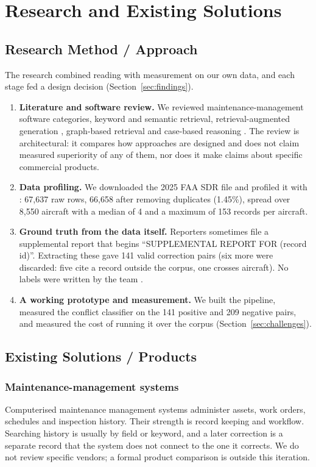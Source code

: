 \chapter{Research and Existing Solutions}\label{ch:research}

\section{Research Method / Approach}
The research combined reading with measurement on our own data, and each stage fed a design decision (Section~\ref{sec:findings}).
\begin{enumerate}
\item \textbf{Literature and software review.} We reviewed maintenance-management software categories, keyword and semantic retrieval, retrieval-augmented generation \citep{lewis2020rag,asai2023selfrag}, graph-based retrieval \citep{edge2024graphrag} and case-based reasoning \citep{aamodt1994cbr}. The review is architectural: it compares how approaches are designed and does not claim measured superiority of any of them, nor does it make claims about specific commercial products.
\item \textbf{Data profiling.} We downloaded the 2025 FAA SDR file and profiled it with : 67,637 raw rows, 66,658 after removing duplicates (1.45\%), spread over 8,550 aircraft with a median of 4 and a maximum of 153 records per aircraft.
\item \textbf{Ground truth from the data itself.} Reporters sometimes file a supplemental report that begins ``SUPPLEMENTAL REPORT FOR (record id)''. Extracting these gave 141 valid correction pairs (six more were discarded: five cite a record outside the corpus, one crosses aircraft). No labels were written by the team \citep{faa-sdr}.
\item \textbf{A working prototype and measurement.} We built the pipeline, measured the conflict classifier on the 141 positive and 209 negative pairs, and measured the cost of running it over the corpus (Section~\ref{sec:challenges}).
\end{enumerate}

\section{Existing Solutions / Products}
\subsection{Maintenance-management systems}
Computerised maintenance management systems administer assets, work orders, schedules and inspection history. Their strength is record keeping and workflow. Searching history is usually by field or keyword, and a later correction is a separate record that the system does not connect to the one it corrects. We do not review specific vendors; a formal product comparison is outside this iteration.

